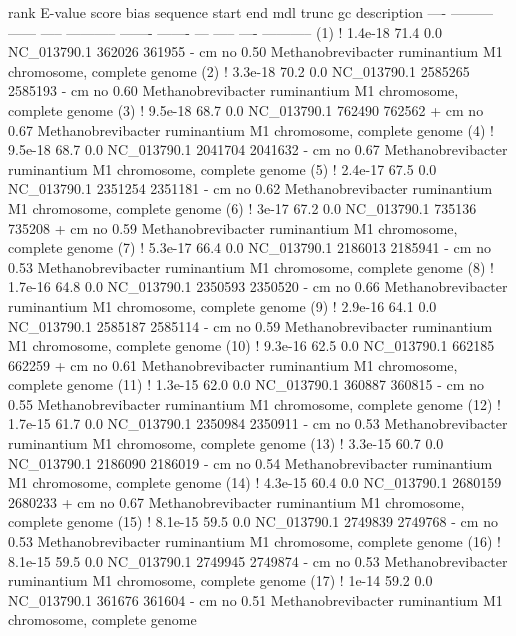 \begin{sreoutput}
 rank     E-value  score  bias  sequence      start     end   mdl trunc   gc  description
 ----   --------- ------ -----  ----------- ------- -------   --- ----- ----  -----------
  (1) !   1.4e-18   71.4   0.0  NC_013790.1  362026  361955 -  cm    no 0.50  Methanobrevibacter ruminantium M1 chromosome, complete genome
  (2) !   3.3e-18   70.2   0.0  NC_013790.1 2585265 2585193 -  cm    no 0.60  Methanobrevibacter ruminantium M1 chromosome, complete genome
  (3) !   9.5e-18   68.7   0.0  NC_013790.1  762490  762562 +  cm    no 0.67  Methanobrevibacter ruminantium M1 chromosome, complete genome
  (4) !   9.5e-18   68.7   0.0  NC_013790.1 2041704 2041632 -  cm    no 0.67  Methanobrevibacter ruminantium M1 chromosome, complete genome
  (5) !   2.4e-17   67.5   0.0  NC_013790.1 2351254 2351181 -  cm    no 0.62  Methanobrevibacter ruminantium M1 chromosome, complete genome
  (6) !     3e-17   67.2   0.0  NC_013790.1  735136  735208 +  cm    no 0.59  Methanobrevibacter ruminantium M1 chromosome, complete genome
  (7) !   5.3e-17   66.4   0.0  NC_013790.1 2186013 2185941 -  cm    no 0.53  Methanobrevibacter ruminantium M1 chromosome, complete genome
  (8) !   1.7e-16   64.8   0.0  NC_013790.1 2350593 2350520 -  cm    no 0.66  Methanobrevibacter ruminantium M1 chromosome, complete genome
  (9) !   2.9e-16   64.1   0.0  NC_013790.1 2585187 2585114 -  cm    no 0.59  Methanobrevibacter ruminantium M1 chromosome, complete genome
 (10) !   9.3e-16   62.5   0.0  NC_013790.1  662185  662259 +  cm    no 0.61  Methanobrevibacter ruminantium M1 chromosome, complete genome
 (11) !   1.3e-15   62.0   0.0  NC_013790.1  360887  360815 -  cm    no 0.55  Methanobrevibacter ruminantium M1 chromosome, complete genome
 (12) !   1.7e-15   61.7   0.0  NC_013790.1 2350984 2350911 -  cm    no 0.53  Methanobrevibacter ruminantium M1 chromosome, complete genome
 (13) !   3.3e-15   60.7   0.0  NC_013790.1 2186090 2186019 -  cm    no 0.54  Methanobrevibacter ruminantium M1 chromosome, complete genome
 (14) !   4.3e-15   60.4   0.0  NC_013790.1 2680159 2680233 +  cm    no 0.67  Methanobrevibacter ruminantium M1 chromosome, complete genome
 (15) !   8.1e-15   59.5   0.0  NC_013790.1 2749839 2749768 -  cm    no 0.53  Methanobrevibacter ruminantium M1 chromosome, complete genome
 (16) !   8.1e-15   59.5   0.0  NC_013790.1 2749945 2749874 -  cm    no 0.53  Methanobrevibacter ruminantium M1 chromosome, complete genome
 (17) !     1e-14   59.2   0.0  NC_013790.1  361676  361604 -  cm    no 0.51  Methanobrevibacter ruminantium M1 chromosome, complete genome

\end{sreoutput}
